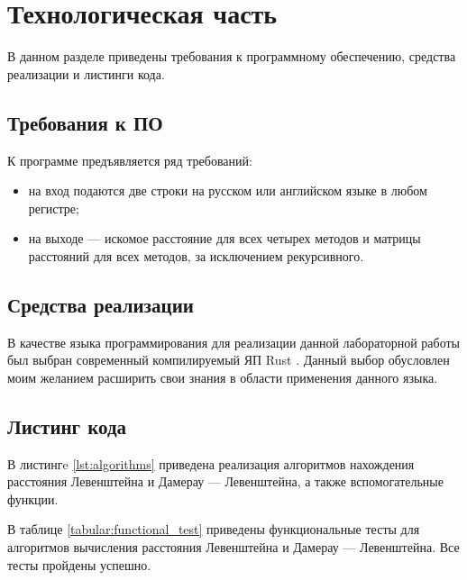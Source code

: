 \chapter{Технологическая часть}

В данном разделе приведены требования к программному обеспечению, средства реализации и листинги кода.

\section{Требования к ПО}

К программе предъявляется ряд требований:
\begin{itemize}
	\item на вход подаются две строки на русском или английском языке в любом регистре;
	\item на выходе — искомое расстояние для всех четырех методов и матрицы расстояний для всех методов, за исключением рекурсивного.
\end{itemize}

\section{Средства реализации}

В качестве языка программирования для реализации данной лабораторной работы был выбран современный компилируемый ЯП Rust \cite{rustlang}. Данный выбор обусловлен моим желанием расширить свои знания в области применения данного языка.

\section{Листинг кода}

В листингe \ref{lst:algorithms} приведена реализация алгоритмов нахождения расстояния Левенштейна и Дамерау — Левенштейна, а также вспомогательные функции.


В таблице \ref{tabular:functional_test} приведены функциональные тесты для алгоритмов вычисления расстояния Левенштейна и Дамерау — Левенштейна. Все тесты пройдены успешно.

